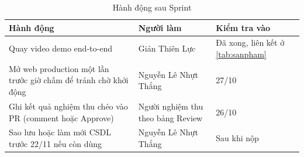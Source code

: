 \begin{table}[htbp]\centering
\caption{Hành động sau Sprint}\label{tab:action}
\begin{tabular}{@{}p{6.3cm}p{3.2cm}p{3.2cm}@{}}\toprule
\textbf{Hành động} & \textbf{Người làm} & \textbf{Kiểm tra vào} \\ \midrule
Quay video demo end-to-end & Giản Thiên Lực & Đã xong, liên kết ở \cref{tab:sanpham} \\
Mở web production một lần trước giờ chấm để tránh chờ khởi động & Nguyễn Lê Nhựt Thắng & 27/10 \\
Ghi kết quả nghiệm thu chéo vào PR (comment hoặc Approve) & Người nghiệm thu theo bảng Review & 26/10 \\
Sao lưu hoặc làm mới CSDL trước 22/11 nếu còn dùng & Nguyễn Lê Nhựt Thắng & Sau khi nộp \\ \bottomrule
\end{tabular}
\end{table}
